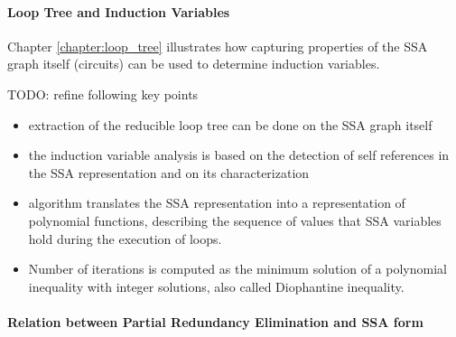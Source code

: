 
\paragraph{Loop Tree and Induction Variables}

Chapter \ref{chapter:loop_tree} illustrates how capturing properties of the SSA graph
itself (circuits) can be used to determine induction variables.

TODO: refine following key points

\begin{itemize}
\item extraction of the reducible loop tree can be done on the SSA graph itself
\item the induction variable analysis is based on the detection of self references in the SSA representation and on its characterization
\item algorithm translates the SSA representation into a representation of polynomial functions, describing the sequence of values that SSA variables hold during the execution of loops.
\item Number of iterations is computed as the minimum solution of a polynomial inequality with integer solutions, also called Diophantine inequality.
\end{itemize}

\paragraph{Relation between Partial Redundancy Elimination and SSA form}

